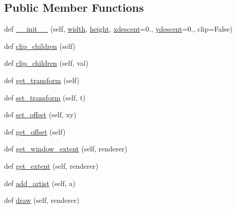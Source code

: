 \subsection*{Public Member Functions}
\begin{DoxyCompactItemize}
\item 
def \hyperlink{classmatplotlib_1_1offsetbox_1_1DrawingArea_a61c4568da537047ebdf2589d7d72f478}{\+\_\+\+\_\+init\+\_\+\+\_\+} (self, \hyperlink{classmatplotlib_1_1offsetbox_1_1DrawingArea_a90f201ac6425e2778784e960eac9d717}{width}, \hyperlink{classmatplotlib_1_1offsetbox_1_1DrawingArea_ae78b32fdfdb0d92601f392f84aeaec72}{height}, \hyperlink{classmatplotlib_1_1offsetbox_1_1DrawingArea_a56e2ffca34fd8e580a950384e4284877}{xdescent}=0., \hyperlink{classmatplotlib_1_1offsetbox_1_1DrawingArea_a353119abd381521f7be70cbc14fe9d38}{ydescent}=0., clip=False)
\item 
def \hyperlink{classmatplotlib_1_1offsetbox_1_1DrawingArea_a7a8a48915b761e4f5a176c44ebfcfb5c}{clip\+\_\+children} (self)
\item 
def \hyperlink{classmatplotlib_1_1offsetbox_1_1DrawingArea_a87f8c3bc9a53b80d56ef2637192ec69a}{clip\+\_\+children} (self, val)
\item 
def \hyperlink{classmatplotlib_1_1offsetbox_1_1DrawingArea_a327fba3fc410aecbaadad25d038b32d5}{get\+\_\+transform} (self)
\item 
def \hyperlink{classmatplotlib_1_1offsetbox_1_1DrawingArea_ad4e4a7802b2d4b4485c654e2256213de}{set\+\_\+transform} (self, t)
\item 
def \hyperlink{classmatplotlib_1_1offsetbox_1_1DrawingArea_a7db51c414fb111f8de13ab069be53744}{set\+\_\+offset} (self, xy)
\item 
def \hyperlink{classmatplotlib_1_1offsetbox_1_1DrawingArea_aba8f844ac506f92ac030ca5d1e4597d4}{get\+\_\+offset} (self)
\item 
def \hyperlink{classmatplotlib_1_1offsetbox_1_1DrawingArea_ae8d439782feaa9cda8eb40d405eab165}{get\+\_\+window\+\_\+extent} (self, renderer)
\item 
def \hyperlink{classmatplotlib_1_1offsetbox_1_1DrawingArea_aa34ed3fba7fc2d1d7b84598ed03e558b}{get\+\_\+extent} (self, renderer)
\item 
def \hyperlink{classmatplotlib_1_1offsetbox_1_1DrawingArea_a664a1f6b7e0d723c4e757487551b0ab8}{add\+\_\+artist} (self, a)
\item 
def \hyperlink{classmatplotlib_1_1offsetbox_1_1DrawingArea_a2d925f7a1b9e7f9d178c6cee73fb122c}{draw} (self, renderer)
\end{DoxyCompactItemize}
